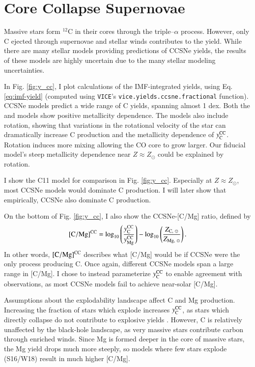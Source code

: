 \documentclass[12pt,oneside]{report}
\newcommand{\VICE}{\texttt{VICE}}
\newcommand{\Ycc}{\ensuremath{y_{\rm C}^{\rm CC}}}
\newcommand{\Yoc}{\ensuremath{y_{\rm Mg}^{\rm CC}}}
\newcommand{\sun}{\ensuremath{\odot}}
\begin{document}
\section{Core Collapse Supernovae}


Massive stars form $^{12}$C in their cores through the triple--$\alpha$ process. However, only C ejected through supernovae and stellar winds contributes to the yield. 
While there are many stellar models providing predictions of CCSNe yields, the results of these models are highly uncertain due to the many stellar modeling uncertainties. 

In Fig. \ref{fig:y_cc}, I plot calculations of the IMF-integrated yields, using Eq. \ref{eq:imf-yield} (computed using \VICE's \texttt{vice.yields.ccsne.fractional} function). 
CCSNe models predict a wide range of C yields, spanning almost 1 dex. 
Both the \citet{NKT13} and \cite{LC18} models show positive metallicity dependence. 
The \cite{LC18} models also include rotation, showing that variations in the rotational velocity of the star can dramatically increase C production and the metallicity dependence of $\Ycc$. Rotation induces more mixing allowing the CO core to grow larger. Our fiducial model's steep metallicity dependence near $Z\approx Z_\odot$ could be explained by rotation. 


I show the C11 model for comparison in Fig. \ref{fig:y_cc}. Especially at $Z\approx Z_\odot$, most CCSNe models would dominate C production. I will later show that empirically, CCSNe also dominate C production. 

On the bottom of Fig. \ref{fig:y_cc}, I also show the CCSNe-[C/Mg] ratio, defined by
\begin{equation}\label{eq:c_mg_cc}
    {\rm [C/Mg]^{CC}} = \log_{10}\left( \frac{\Ycc}{\Yoc}\right) - \log_{10} \left( \frac{Z_{{\rm C},\ \sun }}{Z_{{\rm Mg},\ \sun }} \right).
\end{equation}
In other words, ${\rm [C/Mg]^{CC}}$ describes what [C/Mg] would be if CCSNe were the only process producing C.
Once again, different CCSNe models span a large range in [C/Mg]. 
I chose to instead parameterize $\Ycc$ to enable agreement with observations, as most CCSNe models fail to achieve near-solar [C/Mg].

Assumptions about the explodability landscape affect C and Mg production. Increasing the fraction of stars which explode increases $\Ycc$, as stars which directly collapse do not contribute to explosive yields \citep{emily+21}. However, C is relatively unaffected by the black-hole landscape, as very massive stars contribute carbon through enriched winds. Since Mg is formed deeper in the core of massive stars, the Mg yield drops much more steeply, so models where few stars explode (S16/W18) result in much higher [C/Mg].
\end{document}
